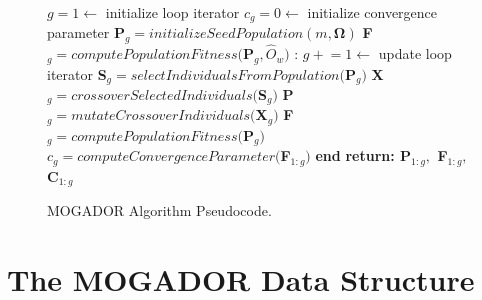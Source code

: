         \begin{figure}[!h]
        \begin{centering}
        \label{euclid}
            \begin{algorithmic}[1]
                         
                    \State $g = 1 \gets$ initialize loop iterator
                    \State $c_g = 0 \gets$ initialize convergence parameter
                    \State \textbf{P}$_g = initializeSeedPopulation(m,\boldsymbol\Omega)$
                    \State \textbf{F}$_g = computePopulationFitness($\textbf{P}$_g,\hat{O}_w)$ 
                    :
                    \State $g \mathrel{+}= 1 \gets$ update loop iterator
                    \State \textbf{S}$_g = selectIndividualsFromPopulation($\textbf{P}$_g)$
                    \State \textbf{X}$_g = crossoverSelectedIndividuals($\textbf{S}$_g)$
                    \State \textbf{P}$_g = mutateCrossoverIndividuals($\textbf{X}$_g)$
                    \State \textbf{F}$_g = computePopulationFitness($\textbf{P}$_g)$
                    \State $c_g = computeConvergenceParameter($\textbf{F}$_{1:g})$
                    \State \textbf{end}
                    \EndWhile
                    \State \textbf{return: \textbf{P}$_{1:g},$ \textbf{F}$_{1:g},$ \textbf{C}$_{1:g}$}
                    
                \EndProcedure
            \end{algorithmic}
        \end{centering}
        \caption{MOGADOR Algorithm Pseudocode.}
        \label{fig:mogador-pseudocode}
        \end{figure}
    
\section{The MOGADOR Data Structure}
    
